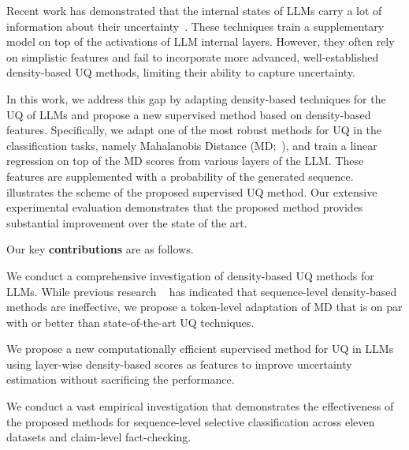 \documentclass[11pt]{article}
\begin{document}
  Recent work has demonstrated that the internal states of LLMs carry a lot of information about their uncertainty~\cite{azaria-mitchell-2023-internal,chen2024eigenscore,he-etal-2024-llm,ch-wang-etal-2024-androids,vazhentsev2024unconditional}. These techniques train a supplementary model on top of the activations of LLM internal layers. However, they often rely on simplistic features and fail to incorporate more advanced, well-established density-based UQ methods, limiting their ability to capture uncertainty.

  In this work, we address this gap by adapting density-based techniques for the UQ of LLMs and
  propose a new supervised method based on density-based features. Specifically, we adapt one of the most robust methods for UQ in the classification tasks, namely Mahalanobis Distance (MD;~\citet{lee2018simple}), and train a linear regression on top of the MD scores from various layers of the LLM. These features are supplemented with a probability of the generated sequence. 
   illustrates the scheme of the proposed supervised UQ method. Our extensive experimental evaluation demonstrates that the proposed method provides substantial improvement over the state of the art.

  Our key \textbf{contributions} are as follows.
  \begin{compactitem}
    \item We conduct a comprehensive investigation of density-based UQ methods for LLMs. While previous research ~\cite{vashurin2024benchmakring} has indicated that sequence-level density-based methods are ineffective, we propose a token-level adaptation of MD that is on par with or better than state-of-the-art UQ techniques.

    \item We propose a new computationally efficient supervised method for UQ in LLMs using layer-wise density-based scores as features to improve uncertainty estimation without sacrificing the performance.

    \item We conduct a vast empirical investigation that demonstrates the effectiveness of the proposed methods for sequence-level selective classification across eleven datasets and claim-level fact-checking.
  \end{compactitem}
    
\end{document}
